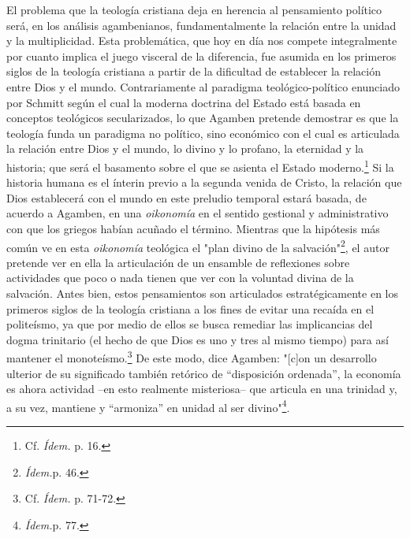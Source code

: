 \documentclass{book}
\begin{document}
El problema que la teología cristiana deja en herencia al pensamiento
político será, en los análisis agambenianos, fundamentalmente la
relación entre la unidad y la multiplicidad. Esta problemática, que hoy
en día nos compete integralmente por cuanto implica el juego visceral de
la diferencia, fue asumida en los primeros siglos de la teología
cristiana a partir de la dificultad de establecer la relación entre Dios
y el mundo. Contrariamente al paradigma teológico-político enunciado por
Schmitt según el cual la moderna doctrina del Estado está basada en
conceptos teológicos secularizados, lo que Agamben pretende demostrar es
que la teología funda un paradigma no político, sino económico con el
cual es articulada la relación entre Dios y el mundo, lo divino y lo
profano, la eternidad y la historia; que será el basamento sobre el que
se asienta el Estado moderno.\footnote{Cf. \emph{Ídem.} p. 16.} Si la
historia humana es el ínterin previo a la segunda venida de Cristo, la
relación que Dios establecerá con el mundo en este preludio temporal
estará basada, de acuerdo a Agamben, en una \emph{oikonomía} en el
sentido gestional y administrativo con que los griegos habían acuñado el
término. Mientras que la hipótesis más común ve en esta \emph{oikonomía}
teológica el "plan divino de la salvación"\footnote{\emph{Ídem.}p. 46.},
el autor pretende ver en ella la articulación de un ensamble de
reflexiones sobre actividades que poco o nada tienen que ver con la
voluntad divina de la salvación. Antes bien, estos pensamientos son
articulados estratégicamente en los primeros siglos de la teología
cristiana a los fines de evitar una recaída en el politeísmo, ya que por
medio de ellos se busca remediar las implicancias del dogma trinitario
(el hecho de que Dios es uno y tres al mismo tiempo) para así mantener
el monoteísmo.\footnote{Cf. \emph{Ídem.} p. 71-72.} De este modo, dice
Agamben: "{[}c{]}on un desarrollo ulterior de su significado también
retórico de ``disposición ordenada'', la economía es ahora actividad
--en esto realmente misteriosa-- que articula en una trinidad y, a su
vez, mantiene y ``armoniza'' en unidad al ser divino"\footnote{\emph{Ídem.}p.
  77.}.
\end{document}
